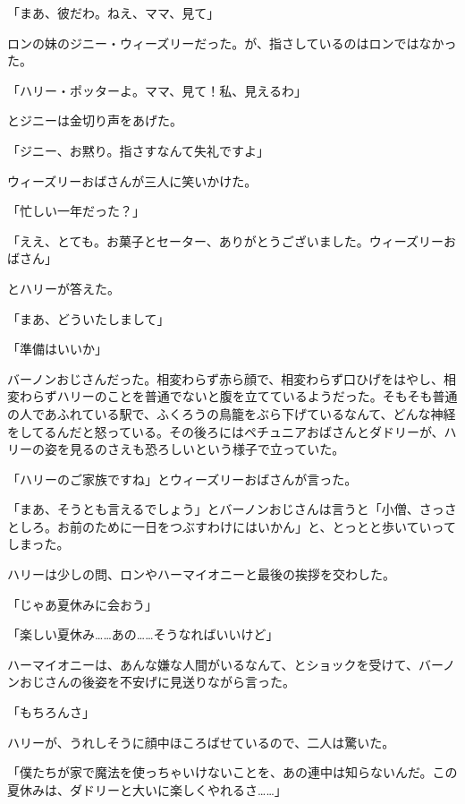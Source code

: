 \documentclass[10pt,a4paper]{article}
\begin{document}
\begin{CJK}{UTF8}{min}
「まあ、彼だわ。ねえ、ママ、見て」

ロンの妹のジニー・ウィーズリーだった。が、指さしているのはロンではなかった。

「ハリー・ポッターよ。ママ、見て！私、見えるわ」

とジニーは金切り声をあげた。

「ジニー、お黙り。指さすなんて失礼ですよ」

ウィーズリーおばさんが三人に笑いかけた。

「忙しい一年だった？」

「ええ、とても。お菓子とセーター、ありがとうございました。ウィーズリーおばさん」

とハリーが答えた。

「まあ、どういたしまして」

「準備はいいか」

バーノンおじさんだった。相変わらず赤ら顔で、相変わらず口ひげをはやし、相変わらずハリーのことを普通でないと腹を立てているようだった。そもそも普通の人であふれている駅で、ふくろうの鳥籠をぶら下げているなんて、どんな神経をしてるんだと怒っている。その後ろにはペチュニアおばさんとダドリーが、ハリーの姿を見るのさえも恐ろしいという様子で立っていた。

「ハリーのご家族ですね」とウィーズリーおばさんが言った。

「まあ、そうとも言えるでしょう」とバーノンおじさんは言うと「小僧、さっさとしろ。お前のために一日をつぶすわけにはいかん」と、とっとと歩いていってしまった。

ハリーは少しの問、ロンやハーマイオニーと最後の挨拶を交わした。

「じゃあ夏休みに会おう」

「楽しい夏休み……あの……そうなればいいけど」

ハーマイオニーは、あんな嫌な人間がいるなんて、とショックを受けて、バーノンおじさんの後姿を不安げに見送りながら言った。

「もちろんさ」

ハリーが、うれしそうに顔中ほころばせているので、二人は驚いた。

「僕たちが家で魔法を使っちゃいけないことを、あの連中は知らないんだ。この夏休みは、ダドリーと大いに楽しくやれるさ……」





\end{CJK}
\end{document}
